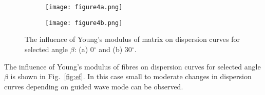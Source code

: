 \documentclass[preprint,12pt]{elsarticle}
\providecommand{\DIFaddbeginFL}{} %
\providecommand{\DIFaddendFL}{} %
\providecommand{\DIFdelbeginFL}{} %
\providecommand{\DIFdelendFL}{} %
\begin{document}
\begin{figure} [h!]
	\centering
	\DIFdelbeginFL %
\DIFdelendFL \begin{subfigure}[b]{0.49\textwidth}
		\centering
		\DIFdelbeginFL %
\DIFdelendFL \DIFaddbeginFL \texttt{[image: figure4a.png]}
		\DIFaddendFL \caption{}
		\label{fig:em0}
	\end{subfigure}
	\hfill
	\begin{subfigure}[b]{0.49\textwidth}
		\centering
		\DIFdelbeginFL %
\DIFdelendFL \DIFaddbeginFL \texttt{[image: figure4b.png]}
		\DIFaddendFL \caption{}
		\label{fig:em30}
	\end{subfigure}
	\caption{The influence of Young's modulus of matrix  on dispersion curves for selected angle $\beta$: (a) 0$^{\circ}$ and (b) 30$^{\circ}$.} 
	\label{fig:em}
\end{figure}

The influence of Young's modulus of fibres on dispersion curves for selected angle $\beta$ is shown in Fig.~\ref{fig:ef}. In this case small to moderate changes in dispersion curves depending on guided wave mode can be observed. 
\end{document}
